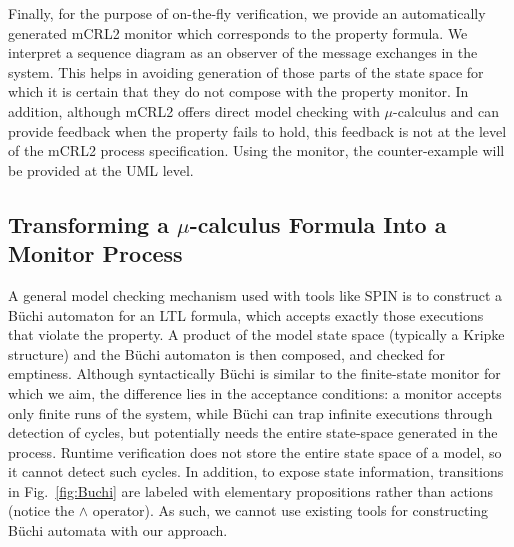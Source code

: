 \documentclass[letter]{llncs}
\begin{document}
Finally, for the purpose of on-the-fly verification, we provide an
automatically generated mCRL2 monitor which corresponds to the property formula.
We interpret a sequence diagram as an observer of
the message exchanges in the system. This helps in avoiding generation of those
parts of the state space for which it is certain that they do not compose with the
property monitor. In addition, although mCRL2 offers direct model checking
with $\mu$-calculus and can provide feedback when the property fails to hold, this
feedback is not at the level of the mCRL2 process specification.
Using the monitor, the counter-example will be provided at the UML level.
\vspace{-13 pt}
\subsection{Transforming a $\mu$-calculus Formula Into a Monitor Process} 
\vspace{-5 pt}
A general model checking mechanism used with tools like SPIN 
is to construct a B\"uchi automaton for an LTL formula, which accepts exactly those executions
that violate the property. A product of the model state space (typically a Kripke structure) and the B\"uchi automaton is then composed, 
and checked for emptiness. 
Although syntactically B\"uchi is similar to the finite-state monitor for which we aim,
the difference lies in the acceptance conditions: a monitor accepts only 
finite runs of the system, while B\"uchi can trap infinite executions through
detection of cycles, but potentially needs the entire state-space
generated in the process. Runtime verification
does not store the entire state space of a model, so it cannot detect such cycles. 
In addition, to expose state information, transitions in Fig.~\ref{fig:Buchi} are labeled with elementary
propositions rather than actions (notice the $\wedge$ operator). 
As such, we cannot use existing tools for constructing B\"uchi automata with our
approach.
\end{document}
